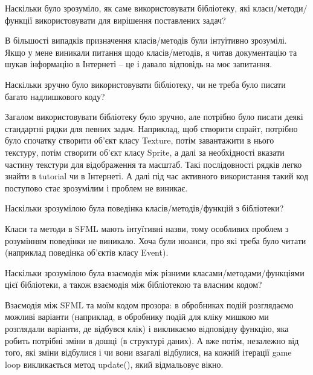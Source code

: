 \begin{DoxyEnumerate}
\item Наскільки було зрозуміло, як саме використовувати бібліотеку, які класи/методи/функції використовувати для вирішення поставлених задач?
\end{DoxyEnumerate}

В більшості випадків призначення класів/методів були інтуїтивно зрозумілі. Якщо у мене виникали питання щодо класів/методів, я читав документацію та шукав інформацію в Інтернеті – це і давало відповідь на моє запитання.


\begin{DoxyEnumerate}
\item Наскільки зручно було використовувати бібліотеку, чи не треба було писати багато надлишкового коду?
\end{DoxyEnumerate}

Загалом використовувати бібліотеку було зручно, але потрібно було писати деякі стандартні рядки для певних задач. Наприклад, щоб створити спрайт, потрібно було спочатку створити об’єкт класу Texture, потім завантажити в нього текстуру, потім створити об’єкт класу Sprite, а далі за необхідності вказати частину текстури для відображення та масштаб. Такі послідовності рядків легко знайти в tutorial чи в Інтернеті. А далі під час активного використання такий код поступово стає зрозумілим і проблем не виникає.


\begin{DoxyEnumerate}
\item Наскільки зрозумілою була поведінка класів/методів/функцій з бібліотеки?
\end{DoxyEnumerate}

Класи та методи в SFML мають інтуїтивні назви, тому особливих проблем з розумінням поведінки не виникало. Хоча були нюанси, про які треба було читати (наприклад поведінка об’єктів класу Event).


\begin{DoxyEnumerate}
\item Наскільки зрозумілою була взаємодія між різними класами/методами/функціями цієї бібліотеки, а також взаємодія між бібліотекою та власним кодом?
\end{DoxyEnumerate}

Взаємодія між SFML та моїм кодом прозора\+: в обробниках подій розглядаємо можливі варіанти (наприклад, в обробнику подій для кліку мишкою ми розглядали варіанти, де відбувся клік) і викликаємо відповідну функцію, яка робить потрібні зміни в дошці (в структурі даних). А вже потім, незалежно від того, які зміни відбулися і чи вони взагалі відбулися, на кожній ітерації game loop викликається метод update(), який відмальовує вікно.

